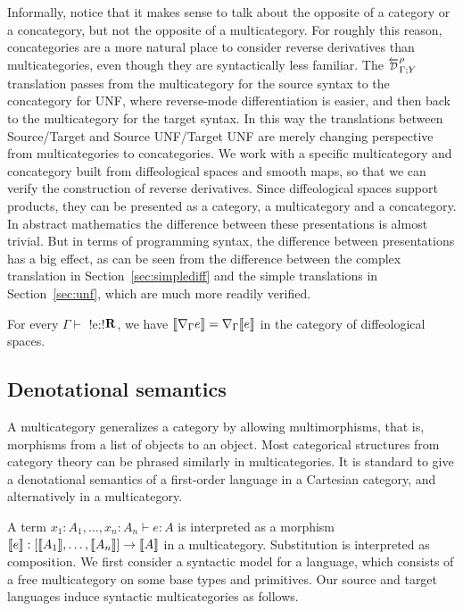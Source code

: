 Informally, notice that it makes sense to talk about the opposite of a category or a concategory, but not the opposite of a multicategory. 
For roughly this reason, concategories are a more natural place to consider reverse derivatives than multicategories, 
even though they are syntactically less familiar. 
The $\directD{\rho}{\Gamma}{Y}$ translation passes from the multicategory for the source syntax to the concategory for UNF, where reverse-mode differentiation is easier, and then back to the multicategory for the target syntax. 
In this way the translations between Source/Target and Source UNF/Target UNF are merely changing perspective from multicategories to concategories.
We work with a specific multicategory and concategory built from diffeological spaces and smooth maps, so that we can verify the construction of reverse derivatives. 
Since diffeological spaces support products, they can be presented as a category, a multicategory and a concategory. 
In abstract mathematics the difference between these presentations is almost trivial. 
But in terms of programming syntax, the difference between presentations has a big effect, as can be seen from the difference between the complex translation in Section~\ref{sec:simplediff} and the simple translations in Section~\ref{sec:unf}, which are much more readily verified.

 \begin{theorem}
     For every $\Gamma \vdash$ !e:!$\mathbf{R}$, we have 
     $\llbracket \nabla_\Gamma e\rrbracket= \nabla_\Gamma\llbracket e\rrbracket$ in the category of diffeological spaces.
 \end{theorem}

\subsection{Denotational semantics} %
\label{sub:Denotational semantics source and Target}

A multicategory generalizes a category by allowing multimorphisms, that is, morphisms from a list of objects to an object.
Most categorical structures from category theory can be phrased similarly in multicategories.
It is standard to give a denotational semantics of a first-order language in a Cartesian category, and alternatively in a multicategory.

A term $x_1:A_1,\ldots,x_n:A_n\vdash e:A$ is interpreted as a morphism $\llbracket e\rrbracket:[\llbracket A_1\rrbracket,\ldots,\llbracket A_n\rrbracket]\to \llbracket A\rrbracket$ in a multicategory.
Substitution is interpreted as composition. We first consider a syntactic model for a language, which consists of a 
free multicategory on some base types and primitives. Our source and target languages induce syntactic multicategories as follows.

